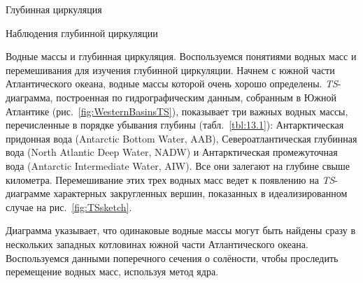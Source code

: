 \begin{chapter}{Глубинная циркуляция}
\begin{section}{Наблюдения глубинной циркуляции}
\begin{paragraph}{Водные массы и глубинная циркуляция.}
Воспользуемся понятиями водных масс
и перемешивания для изучения
глубинной циркуляции. Начнем с южной части Атлантического океана, водные
массы которой очень хорошо определены. \emph{TS}-диаграмма, построенная по
гидрографическим данным,
собранным в Южной Атлантике (рис.~\ref{fig:WesternBasinsTS}), показывает
три важных водных массы, перечисленные в порядке убывания 
глубины (табл.~\ref{tbl:13.1}): Антарктическая придонная 
вода (Antarctic Bottom Water, AAB), 
Североатлантическая глубинная вода 
(North Atlantic Deep Water, NADW) и Антарктическая промежуточная 
вода
(Antarctic Intermediate Water, AIW). Все они залегают на глубине свыше 
километра. Перемешивание этих трех водных
масс ведет к появлению на \emph{TS}-диаграмме характерных закругленных
вершин, показанных в идеализированном случае на рис.~\ref{fig:TSsketch}.
%

Диаграмма указывает, что одинаковые водные массы могут быть найдены сразу
в нескольких западных котловинах южной части Атлантического океана.
Воспользуемся данными поперечного сечения о солёности, чтобы проследить
перемещение водных масс, используя метод ядра.
%


\end{paragraph}
\end{section}
\end{chapter}
